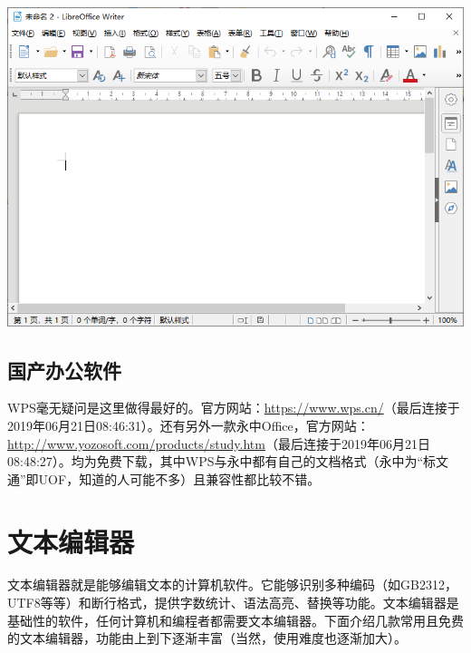 \documentclass{book}
\begin{document}
\begin{center}
	\includegraphics[scale=0.7]{pic/loffice_wr}
\end{center}
\subsection{国产办公软件}
WPS毫无疑问是这里做得最好的。官方网站：\url{https://www.wps.cn/}（最后连接于2019年06月21日08:46:31）。还有另外一款永中Office，官方网站：\url{http://www.yozosoft.com/products/study.htm}（最后连接于2019年06月21日08:48:27）。均为免费下载，其中WPS与永中都有自己的文档格式（永中为“标文通”即UOF，知道的人可能不多）且兼容性都比较不错。
\section{文本编辑器}
文本编辑器就是能够编辑文本的计算机软件。它能够识别多种编码（如GB2312，UTF8等等）和断行格式，提供字数统计、语法高亮、替换等功能。文本编辑器是基础性的软件，任何计算机和编程者都需要文本编辑器。下面介绍几款常用且免费的文本编辑器，功能由上到下逐渐丰富（当然，使用难度也逐渐加大）。
\end{document}
